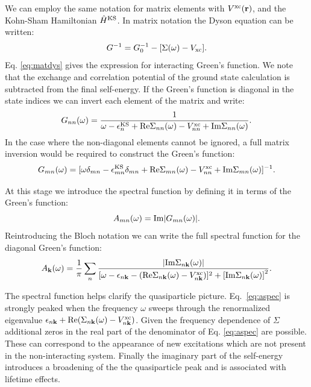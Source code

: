 We can employ the same notation for matrix elements with $V^{\rm{xc}}({\bf r})$,
and the Kohn-Sham Hamiltonian $\hat{H}^{\rm{KS}}$.
%
In matrix notation the Dyson equation \cite{inkson86} can be written:
%
\begin{equation}
\label{eq:matdys}
G^{-1} = G_{0}^{-1} - [\Sigma(\omega) - V_{\rm{xc}}].
\end{equation}
%
Eq. \ref{eq:matdys} gives the expression for interacting Green's function.
We note that the exchange and correlation potential of the ground state
calculation is subtracted from the final self-energy. If the Green's function is diagonal
in the state indices we can invert each element of the matrix and write:
%
\begin{equation}
G_{nn}(\omega) = \frac{1}{\omega -\epsilon^{\rm{KS}}_{n}+{\rm Re}\Sigma_{nn}(\omega)-V^{\rm{xc}}_{nn}+{\rm Im}\Sigma_{nn}(\omega)}.
\end{equation}
%
In the case where the non-diagonal elements cannot be ignored,
a full matrix inversion would be required to construct the Green's function:
%
\begin{equation}
G_{mn}(\omega) = [\omega \delta_{mn} - \epsilon^{\rm{KS}}_{mn}\delta_{mn} + {\rm Re}\Sigma_{mn}(\omega) - V^{\rm{xc}}_{nn} + {\rm Im}\Sigma_{mn}(\omega)]^{-1}.
\end{equation}

At this stage we introduce the spectral function by defining it in terms of the Green's function:
%
\begin{equation}
A_{mn}(\omega) = {\rm Im} |G_{mn}(\omega)|.
\end{equation}
%
Reintroducing the Bloch notation we can write the full spectral function
for the diagonal Green's function:
%
\begin{equation}
\label{eq:aspec}
A_{\bf k}(\omega) = \frac{1}{\pi}\sum_{n} \frac{|{\rm Im}\Sigma_{n{\bf k}}(\omega)|}
{[\omega- \epsilon_{n{\bf k}}-({\rm Re}\Sigma_{n{\bf k}}(\omega) -V^{\rm{xc}}_{n{\bf k}})]^{2} + \left[{\rm Im}\Sigma_{n{\bf k}}(\omega)\right]^{2}}.
\end{equation}

The spectral function helps clarify the quasiparticle picture. Eq.~\ref{eq:aspec} is strongly
peaked when the frequency $\omega$ sweeps through the renormalized
eigenvalue $\epsilon_{n{\bf k}} + {\rm Re}(\Sigma_{n{\bf k}}(\omega) - V^{\rm{xc}}_{n{\bf k}}) $. Given
the frequency dependence of $\Sigma$ additional zeros in the real part of the
denominator of Eq. \ref{eq:aspec} are possible. These can correspond to the
appearance of new excitations which are not present in the non-interacting system. Finally
the imaginary part of the self-energy introduces a broadening of the the quasiparticle peak
and is associated with lifetime effects.

